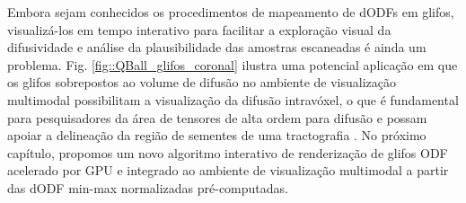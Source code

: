 \documentclass[
    12pt,                %
    oneside,            %
    a4paper,            %
    english,            %
    french,                %
    spanish,            %
    brazil                %
    ]{abntex2}
\begin{document}
Embora sejam conhecidos os procedimentos de mapeamento de dODFs em glifos, visualizá-los em tempo interativo para facilitar a exploração visual da difusividade e análise da plausibilidade das amostras escaneadas é ainda um problema. Fig. \ref{fig::QBall_glifos_coronal} ilustra uma potencial aplicação em que os glifos sobrepostos ao volume de difusão no ambiente de visualização multimodal possibilitam a visualização da difusão intravóxel, o que é fundamental para pesquisadores da área de tensores de alta ordem para difusão \cite{peeters2009} e possam apoiar a delineação da região de sementes de uma tractografia \cite{voltoline2021}.
No próximo capítulo, propomos um novo algoritmo interativo de renderização de glifos ODF acelerado por GPU e integrado ao ambiente de visualização multimodal a partir das dODF min-max normalizadas pré-computadas.

 
\end{document}
